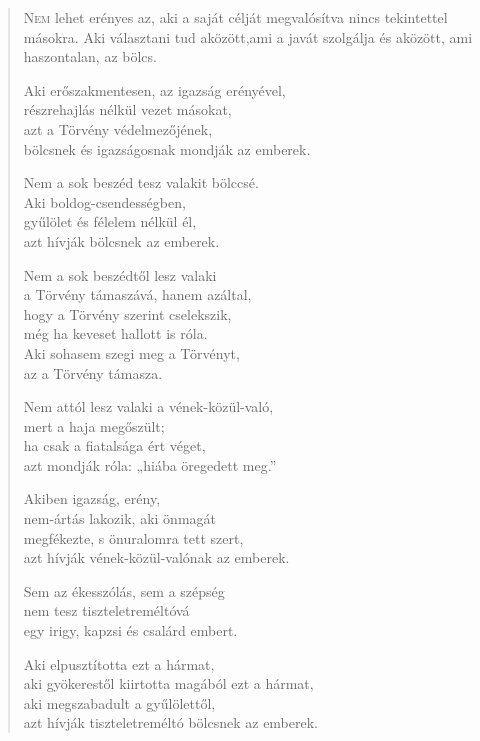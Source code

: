 
\begin{verse}

{\par%
\lettrine{N}{em} {\LettrineTextFont lehet erényes az, aki a saját célját}\newline
megvalósítva nincs tekintettel másokra.\newline
Aki választani tud aközött,\verselinebreak ami a javát szolgálja\verselinebreak
és aközött, ami haszontalan, az bölcs.
\par}

 Aki erőszakmentesen, az igazság erényével,\\
részrehajlás nélkül vezet másokat,\\
azt a Törvény védelmezőjének,\\
bölcsnek és igazságosnak mondják az emberek.

 Nem a sok beszéd tesz valakit bölccsé.\\
Aki boldog-csendességben,\\
gyűlölet és félelem nélkül él,\\
azt hívják bölcsnek az emberek.

\newpage

 Nem a sok beszédtől lesz valaki\\
a Törvény támaszává, hanem azáltal,\\
hogy a Törvény szerint cselekszik,\\
még ha keveset hallott is róla.\\
Aki sohasem szegi meg a Törvényt,\\
az a Törvény támasza.

 Nem attól lesz valaki a vének-közül-való,\\
mert a haja megőszült;\\
ha csak a fiatalsága ért véget,\\
azt mondják róla: „hiába öregedett meg.”

 Akiben igazság, erény,\\
nem-ártás lakozik, aki önmagát\\
megfékezte, s önuralomra tett szert,\\
azt hívják vének-közül-valónak az emberek.

 Sem az ékesszólás, sem a szépség\\
nem tesz tiszteletreméltóvá\\
egy irigy, kapzsi és csalárd embert.

 Aki elpusztította ezt a hármat,\\
aki gyökerestől kiirtotta magából ezt a hármat,\\
aki megszabadult a gyűlölettől,\\
azt hívják tiszteletreméltó bölcsnek az emberek.


\end{verse}
